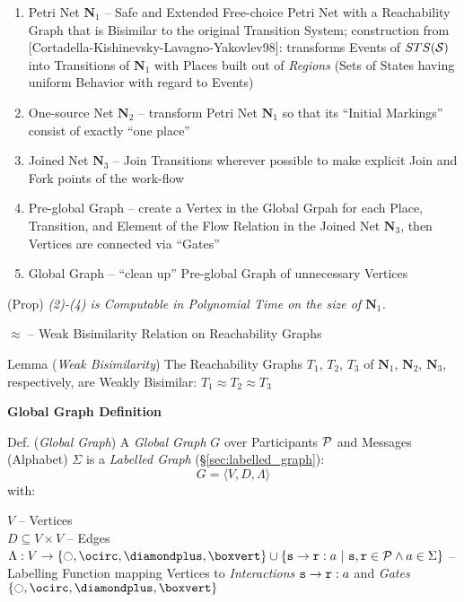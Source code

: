 \begin{enumerate}
  \item Petri Net $\mathbf{N}_1$ -- Safe and Extended Free-choice
    Petri Net with a Reachability Graph that is Bisimilar to the
    original Transition System; construction from
    [Cortadella-Kishinevsky-Lavagno-Yakovlev98]: transforms Events of
    $STS(\mathcal{S})$ into Transitions of $\mathbf{N}_1$ with Places
    built out of \emph{Regions} (Sets of States having uniform
    Behavior with regard to Events)
  \item One-source Net $\mathbf{N}_2$ -- transform Petri Net
    $\mathbf{N}_1$ so that its ``Initial Markings'' consist of exactly
    ``one place'' %
  \item Joined Net $\mathbf{N}_3$ -- Join Transitions wherever
    possible to make explicit Join and Fork points of the work-flow
  \item Pre-global Graph -- create a Vertex in the Global Grpah for
    each Place, Transition, and Element of the Flow Relation in the
    Joined Net $\mathbf{N}_3$, then Vertices are connected via
    ``Gates''
  \item Global Graph -- ``clean up'' Pre-global Graph of unnecessary
    Vertices
\end{enumerate}

(Prop) \emph{(2)-(4) is Computable in Polynomial Time on the size of
  $\mathbf{N}_1$.}

$\approx$ -- Weak Bisimilarity Relation on Reachability Graphs

Lemma (\emph{Weak Bisimilarity}) The Reachability Graphs $T_1$, $T_2$,
$T_3$ of $\mathbf{N}_1$, $\mathbf{N}_2$, $\mathbf{N}_3$, respectively,
are Weakly Bisimilar: $T_1 \approx T_2 \approx T_3$


\textbf{Global Graph Definition}

Def. (\emph{Global Graph}) A \emph{Global Graph} $G$ over Participants
$\mathcal{P}$ and Messages (Alphabet) $\Sigma$ is a \emph{Labelled
  Graph} (\S\ref{sec:labelled_graph}):
\[
  G = \langle{V,D,\Lambda}\rangle
\]
with:

$V$ -- Vertices \\
$D\subseteq{V \times V}$ -- Edges \\
$\Lambda : V \rightarrow
  \{ \ocircle, \ocirc, \diamondplus, \boxvert \} \cup
  \{ \party{s}\rightarrow\party{r}:a
    \ |\ \party{s,r}\in\class{P} \wedge a \in \Sigma \}$
-- Labelling Function mapping Vertices to \emph{Interactions}
$\mathtt{s}\rightarrow\mathtt{r}:a$ and \emph{Gates} $\{ \ocircle,
\ocirc, \diamondplus, \boxvert \}$

